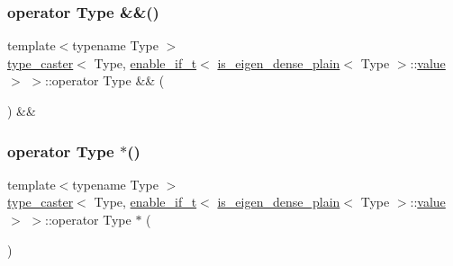 \subsubsection{\texorpdfstring{operator Type \&\&()}{operator Type \&\&()}}
{\footnotesize\ttfamily template$<$typename Type $>$ \\
\mbox{\hyperlink{classtype__caster}{type\+\_\+caster}}$<$ Type, \mbox{\hyperlink{detail_2common_8h_a012819c9e8b5e04872a271f50f8b8196}{enable\+\_\+if\+\_\+t}}$<$ \mbox{\hyperlink{eigen_8h_a93c6985faade6e9052f9e0917826b26d}{is\+\_\+eigen\+\_\+dense\+\_\+plain}}$<$ Type $>$\+::\mbox{\hyperlink{_s_d_l__opengl__glext_8h_a8ad81492d410ff2ac11f754f4042150f}{value}} $>$ $>$\+::operator Type \&\& (\begin{DoxyParamCaption}{ }\end{DoxyParamCaption}) \&\&\hspace{0.3cm}{\ttfamily [inline]}}

\mbox{\label{structtype__caster_3_01_type_00_01enable__if__t_3_01is__eigen__dense__plain_3_01_type_01_4_1_1value_01_4_01_4_a643991d05a4ae6694d05d26fcbc27daf}} 
\subsubsection{\texorpdfstring{operator Type $\ast$()}{operator Type *()}}
{\footnotesize\ttfamily template$<$typename Type $>$ \\
\mbox{\hyperlink{classtype__caster}{type\+\_\+caster}}$<$ Type, \mbox{\hyperlink{detail_2common_8h_a012819c9e8b5e04872a271f50f8b8196}{enable\+\_\+if\+\_\+t}}$<$ \mbox{\hyperlink{eigen_8h_a93c6985faade6e9052f9e0917826b26d}{is\+\_\+eigen\+\_\+dense\+\_\+plain}}$<$ Type $>$\+::\mbox{\hyperlink{_s_d_l__opengl__glext_8h_a8ad81492d410ff2ac11f754f4042150f}{value}} $>$ $>$\+::operator Type $\ast$ (\begin{DoxyParamCaption}{ }\end{DoxyParamCaption})\hspace{0.3cm}{\ttfamily [inline]}}



